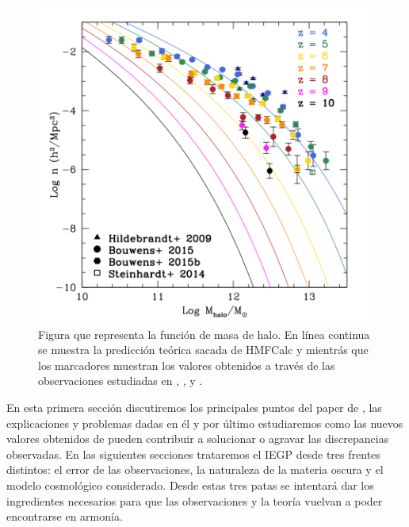 \begin{figure}[h]
	\begin{center}
	
		\includegraphics[scale=0.5]{Figures/steindhart_fig1}
		\caption{\label{fig:stein16_f1} Figura que representa la funci\'on de masa de halo. En l\'inea continua se muestra la predicci\'on te\'orica sacada de HMFCalc \citep{murray2013hmfcalc} y \cite{sheth2001ellipsoidal} mientr\'as que los marcadores muestran los valores obtenidos a trav\'es de las observaciones estudiadas en \cite{hildebrandt2009cars}, \cite{steinhardt2014uniform}, \cite{bouwens2015reionization} y \cite{bouwens2015uv}.}
		
	\end{center}
\end{figure}

En esta primera sección discutiremos los principales puntos del paper de \cite{steinhardt2016impossibly}, las explicaciones y problemas dadas en él y por último estudiaremos como las nuevos valores obtenidos de \cite{behroozi2019universemachine} pueden contribuir a solucionar o agravar las discrepancias observadas. En las siguientes secciones trataremos el IEGP desde tres frentes distintos: el error de las observaciones, la naturaleza de la materia oscura y el modelo cosmológico considerado. Desde estas tres patas se intentará dar los ingredientes necesarios para que las observaciones y la teoría vuelvan a poder encontrarse en armonía.


